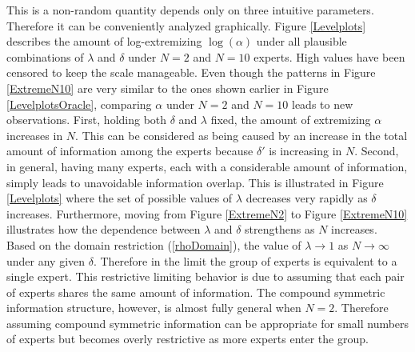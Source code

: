 \documentclass[11pt]{article}
\theoremstyle{definition}
\theoremstyle{definition}
\begin{document}
This is a non-random quantity depends only on three intuitive parameters. Therefore it can be conveniently analyzed graphically. Figure \ref{Levelplots} describes the amount of log-extremizing $\log(\alpha)$ under all plausible combinations of $\lambda$ and $\delta$ under $N = 2$ and $N = 10$ experts. High values have been censored to keep the scale manageable. Even though the patterns in Figure \ref{ExtremeN10}  are very similar to the ones shown earlier in Figure \ref{LevelplotsOracle}, comparing $\alpha$ under $N = 2$ and $N = 10$ leads to new observations. First, holding both $\delta$ and $\lambda$ fixed, the amount of extremizing $\alpha$ increases in $N$. This can be considered as being caused by an increase in the total amount of information among the experts because $\delta'$ is increasing in $N$. Second, in general, having many experts, each with a considerable amount of information, simply leads to unavoidable information overlap. This is illustrated in Figure \ref{Levelplots} where the set of possible values of $\lambda$ decreases very rapidly as $\delta$ increases. Furthermore, moving from Figure \ref{ExtremeN2} to Figure \ref{ExtremeN10} illustrates how the dependence between $\lambda$ and $\delta$ strengthens as $N$ increases. Based on the domain restriction (\ref{rhoDomain}), the value of $\lambda \to 1$ as $N \to \infty$ under any given $\delta$. Therefore in the limit the group of experts is equivalent to a single expert. This restrictive limiting behavior is due to assuming that each pair of experts shares the same amount of information. The compound symmetric information structure, however, is almost fully general when $N = 2$. Therefore assuming compound symmetric information can be appropriate for small numbers of experts but becomes overly restrictive as more experts enter the group. 
\end{document}
